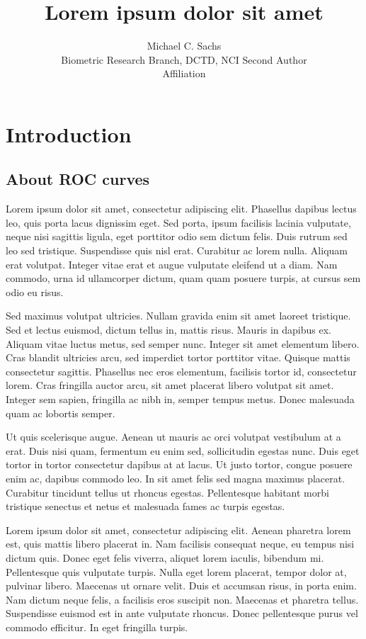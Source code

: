 \documentclass[article]{ojbs}  %
\author{		Michael C. Sachs\\Biometric Research Branch, DCTD, NCI
	\And Second Author\\Affiliation	} %
\title{Lorem ipsum dolor sit amet}
\begin{document}
\section{Introduction}\label{introduction}

\subsection{About ROC curves}\label{about-roc-curves}

Lorem ipsum dolor sit amet, consectetur adipiscing elit. Phasellus dapibus lectus leo, quis porta lacus dignissim eget. Sed porta, ipsum facilisis lacinia vulputate, neque nisi sagittis ligula, eget porttitor odio sem dictum felis. Duis rutrum sed leo sed tristique. Suspendisse quis nisl erat. Curabitur ac lorem nulla. Aliquam erat volutpat. Integer vitae erat et augue vulputate eleifend ut a diam. Nam commodo, urna id ullamcorper dictum, quam quam posuere turpis, at cursus sem odio eu risus.

Sed maximus volutpat ultricies. Nullam gravida enim sit amet laoreet tristique. Sed et lectus euismod, dictum tellus in, mattis risus. Mauris in dapibus ex. Aliquam vitae luctus metus, sed semper nunc. Integer sit amet elementum libero. Cras blandit ultricies arcu, sed imperdiet tortor porttitor vitae. Quisque mattis consectetur sagittis. Phasellus nec eros elementum, facilisis tortor id, consectetur lorem. Cras fringilla auctor arcu, sit amet placerat libero volutpat sit amet. Integer sem sapien, fringilla ac nibh in, semper tempus metus. Donec malesuada quam ac lobortis semper.

Ut quis scelerisque augue. Aenean ut mauris ac orci volutpat vestibulum at a erat. Duis nisi quam, fermentum eu enim sed, sollicitudin egestas nunc. Duis eget tortor in tortor consectetur dapibus at at lacus. Ut justo tortor, congue posuere enim ac, dapibus commodo leo. In sit amet felis sed magna maximus placerat. Curabitur tincidunt tellus ut rhoncus egestas. Pellentesque habitant morbi tristique senectus et netus et malesuada fames ac turpis egestas.

Lorem ipsum dolor sit amet, consectetur adipiscing elit. Aenean pharetra lorem est, quis mattis libero placerat in. Nam facilisis consequat neque, eu tempus nisi dictum quis. Donec eget felis viverra, aliquet lorem iaculis, bibendum mi. Pellentesque quis vulputate turpis. Nulla eget lorem placerat, tempor dolor at, pulvinar libero. Maecenas ut ornare velit. Duis et accumsan risus, in porta enim. Nam dictum neque felis, a facilisis eros suscipit non. Maecenas et pharetra tellus. Suspendisse euismod est in ante vulputate rhoncus. Donec pellentesque purus vel commodo efficitur. In eget fringilla turpis.
\end{document}
